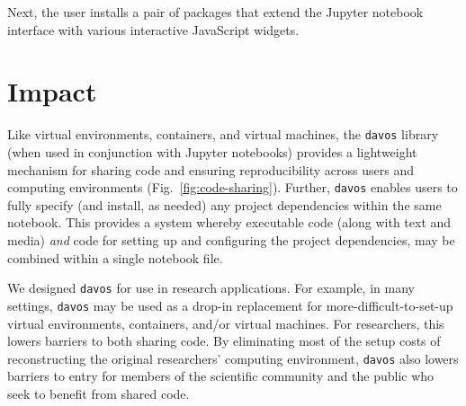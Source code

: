 \documentclass[preprint,12pt,a4paper]{elsarticle}
\begin{document}






Next, the user installs a pair of packages that extend the Jupyter notebook interface with various interactive JavaScript widgets.






\section{Impact}

Like virtual environments, containers, and virtual machines, the
\texttt{davos} library (when used in conjunction with Jupyter
notebooks) provides a light\-weight mechanism for sharing code and
ensuring reproducibility across users and computing environments
(Fig.~\ref{fig:code-sharing}). Further, \texttt{davos} enables users
to fully specify (and install, as needed) any project dependencies
within the same notebook. This provides a system whereby executable
code (along with text and media) \textit{and} code for setting up and
configuring the project dependencies, may be combined within a single
notebook file.

We designed \texttt{davos} for use in research applications. For
example, in many settings, \texttt{davos} may be used as a drop-in
replacement for more-difficult-to-set-up virtual environments,
containers, and/or virtual machines. For researchers, this lowers
barriers to both sharing code. By eliminating most of the setup costs
of reconstructing the original researchers' computing environment,
\texttt{davos} also lowers barriers to entry for members of
the scientific community and the public who seek to benefit
from shared code.
\end{document}
